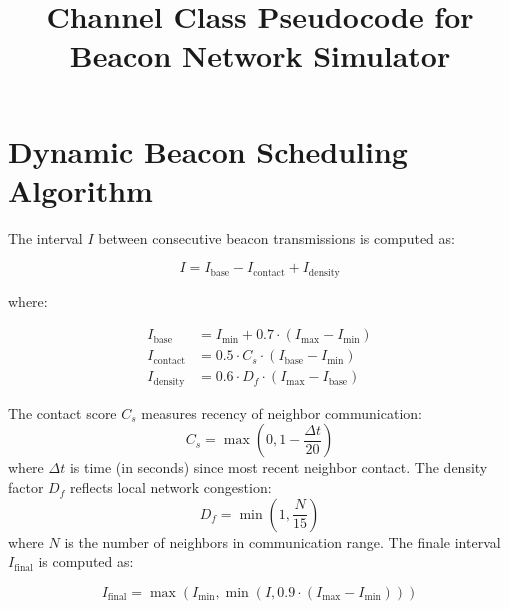 \documentclass{article}
\begin{document}
\title{Channel Class Pseudocode for Beacon Network Simulator}
\section{Dynamic Beacon Scheduling Algorithm}

The interval $I$ between consecutive beacon transmissions is computed as:

\begin{equation}
I = I_{\text{base}} - I_{\text{contact}} + I_{\text{density}}
\end{equation}

\noindent where:

\begin{align}
I_{\text{base}} &= I_{\text{min}} + 0.7 \cdot (I_{\text{max}} - I_{\text{min}}) \\
I_{\text{contact}} &= 0.5 \cdot C_s \cdot (I_{\text{base}} - I_{\text{min}}) \\
I_{\text{density}} &= 0.6 \cdot D_f \cdot (I_{\text{max}} - I_{\text{base}})
\end{align}

The contact score $C_s$ measures recency of neighbor communication:
\begin{equation}
C_s = \max\left(0, 1 - \frac{\Delta t}{20}\right)
\end{equation}
where $\Delta t$ is time (in seconds) since most recent neighbor contact. The density factor $D_f$ reflects local network congestion:
\begin{equation}
D_f = \min\left(1, \frac{N}{15}\right)
\end{equation}
where $N$ is the number of neighbors in communication range. The finale interval $I_{\text{final}}$ is computed as:

\begin{equation}
I_{\text{final}} = \max(I_{\text{min}}, \min(I, 0.9 \cdot (I_{\text{max}} - I_{\text{min}})))
\end{equation}
\end{document}
